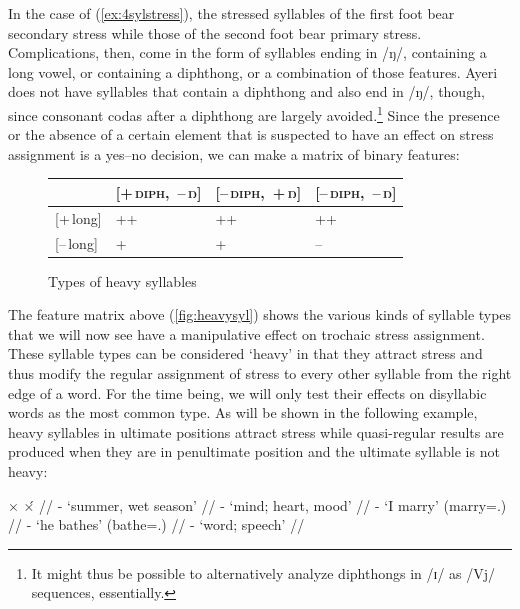 In the case of (\ref{ex:4sylstress}), the stressed syllables of the first foot 
bear secondary stress while those of the second foot bear primary stress. 
Complications, then, come in the form of syllables ending in /ŋ/, containing a 
long vowel, or containing a diphthong, or a combination of those features.
Ayeri does not have syllables that contain a diphthong and 
also end in /ŋ/, though, since consonant codas after a diphthong are largely 
avoided.\footnote{It might thus be possible to alternatively analyze diphthongs 
in /ɪ/ as /Vj/ sequences, essentially.} Since the presence or the absence of a 
certain element that is suspected to have an effect on stress assignment is a 
yes–no decision, we can make a matrix of binary features:

\begin{figure}[h]\centering
\caption{Types of heavy syllables}
\scshape
\begin{tabu} to .75\linewidth {H X[c] X[c] X[c]}
\tableheaderfont\toprule

	& \textsc{[+\,diph,~–\,ŋ]}
	& \textsc{[–\,diph,~+\,ŋ]}
	& \textsc{[–\,diph,~–\,ŋ]}
	\\
	
\toprule

[+\,long]
	& ++
	& ++
	& ++
	\\

[–\,long]
	& +
	& +
	& –
	\\

\bottomrule
\end{tabu}
\label{fig:heavysyl}
\end{figure}

The feature matrix above (\autoref{fig:heavysyl}) shows the various kinds of 
syllable types that we will now see have a manipulative effect on trochaic 
stress assignment. These syllable types can be considered `heavy' in that they
attract stress and thus modify the regular assignment of stress to every other 
syllable from the right edge of a word. For the time being, we will only test 
their effects on disyllabic words as the most common type. As will be shown in 
the following example, heavy syllables in ultimate positions attract stress 
while quasi-regular results are produced when they are in penultimate position 
and the ultimate syllable is not heavy:

\pex[everygla=\upshape]\label{ex:firstlh}
\a\label{ex:firstlight}\begingl
	\gla ×		{}	×́	{} //
	\glb {}	-	
		{`summer, wet season'} //
	\glb {}	-		{`mind; heart, mood'} //
	\glb {}	-	
		{`I marry' (marry=\Fsg{}.\Top{})} //
	\glb {}	-	
		{`he bathes' (bathe=\TsgM{}.\Aarg{})} //
	\glb {}	-		{`word; speech'} //
\endgl

